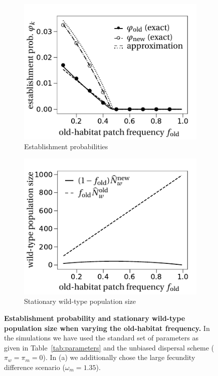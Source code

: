 \documentclass[a4paper,11pt]{scrartcl}
\begin{document}
\begin{figure}[h!]
	\centering
	\begin{subfigure}{.5\textwidth}
  		\centering
  		\includegraphics[width=\linewidth]{figS3a.pdf}
  		\caption{Establishment probabilities}
	\end{subfigure}%
	\begin{subfigure}{.5\textwidth}
 		 \centering
 		 \includegraphics[width=\linewidth]{figS3b.pdf}
  	\caption{Stationary wild-type population size}
	\end{subfigure}
	\caption{\textbf{Establishment probability and stationary wild-type population size when varying the old-habitat frequency.} In the simulations we have used the standard set of parameters as given in Table~\ref{tab:parameters} and the unbiased dispersal scheme ($\pi_w=\pi_m=0$). In (a) we additionally chose the large fecundity difference scenario ($\omega_m=1.35$).}
	\label{Sfig:vary_f_origin}
\end{figure}
\end{document}
